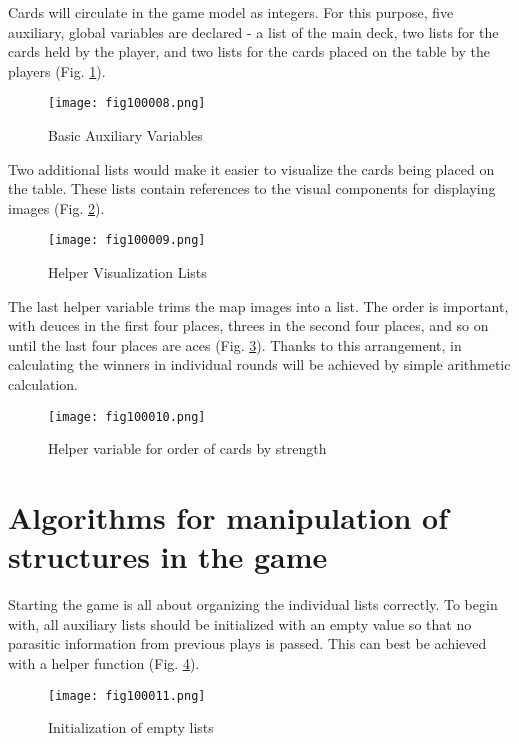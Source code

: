 Cards will circulate in the game model as integers. For this purpose, five auxiliary, global variables are declared - a list of the main deck, two lists for the cards held by the player, and two lists for the cards placed on the table by the players (Fig. \ref{fig100008}).

\begin{figure}[H]
   \centering
   \texttt{[image: fig100008.png]}
   \caption{Basic Auxiliary Variables}
\label{fig100008}
\end{figure}

Two additional lists would make it easier to visualize the cards being placed on the table. These lists contain references to the visual components for displaying images (Fig. \ref{fig100009}).

\begin{figure}[H]
   \centering
   \texttt{[image: fig100009.png]}
   \caption{Helper Visualization Lists}
\label{fig100009}
\end{figure}

The last helper variable trims the map images into a list. The order is important, with deuces in the first four places, threes in the second four places, and so on until the last four places are aces (Fig. \ref{fig100010}). Thanks to this arrangement, in calculating the winners in individual rounds will be achieved by simple arithmetic calculation.

\begin{figure}[H]
   \centering
   \texttt{[image: fig100010.png]}
   \caption{Helper variable for order of cards by strength}
\label{fig100010}
\end{figure}

\section{Algorithms for manipulation of structures in the game}

Starting the game is all about organizing the individual lists correctly. To begin with, all auxiliary lists should be initialized with an empty value so that no parasitic information from previous plays is passed. This can best be achieved with a helper function (Fig. \ref{fig100011}).

\begin{figure}[H]
   \centering
   \texttt{[image: fig100011.png]}
   \caption{Initialization of empty lists}
\label{fig100011}
\end{figure}


